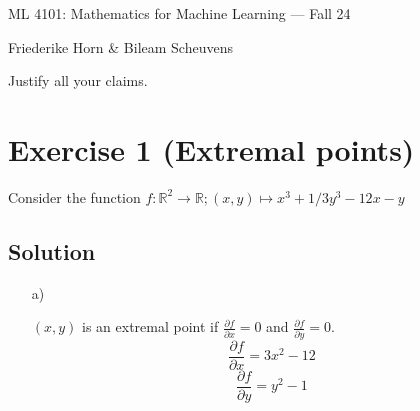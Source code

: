 \documentclass[10pt]{article}
\numberwithin{equation}{section}
\begin{document}
\begin{center}
    \sc ML 4101: Mathematics for Machine Learning --- Fall 24
\end{center}

\noindent Friederike Horn \& Bileam Scheuvens

Justify all your claims.
\section*{Exercise 1 (Extremal points)}
Consider the function $f: \mathbb{R}^2 \to \mathbb{R}; (x, y) \mapsto x^3 + 1/3y^3 -12x -y$
\subsection*{Solution}
\begin{enumerate}
\item[a)]{
$(x, y)$ is an extremal point if $\frac{\partial f}{\partial x}=0$ and $\frac{\partial f}{\partial y} = 0$. \\
$$\frac{\partial f}{\partial x} = 3 x^2 -12$$
$$\frac{\partial f}{\partial y} = y^2 -1$$

}
\end{enumerate}
\end{document}
